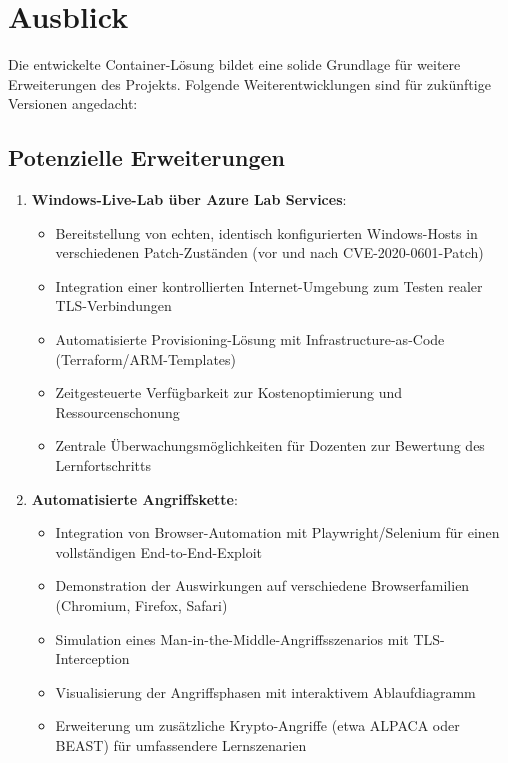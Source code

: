 \documentclass{article}
\begin{document}
\newpage

\section{Ausblick}
Die entwickelte Container-Lösung bildet eine solide Grundlage für weitere Erweiterungen des Projekts. Folgende Weiterentwicklungen sind für zukünftige Versionen angedacht:

\subsection{Potenzielle Erweiterungen}
\begin{enumerate}
  \item \textbf{Windows-Live-Lab über Azure Lab Services}: 
  \begin{itemize}
    \item Bereitstellung von echten, identisch konfigurierten Windows-Hosts in verschiedenen Patch-Zuständen (vor und nach CVE-2020-0601-Patch)
    \item Integration einer kontrollierten Internet-Umgebung zum Testen realer TLS-Verbindungen
    \item Automatisierte Provisioning-Lösung mit Infrastructure-as-Code (Terraform/ARM-Templates)
    \item Zeitgesteuerte Verfügbarkeit zur Kostenoptimierung und Ressourcenschonung
    \item Zentrale Überwachungsmöglichkeiten für Dozenten zur Bewertung des Lernfortschritts
  \end{itemize}
  
  \item \textbf{Automatisierte Angriffskette}: 
  \begin{itemize}
    \item Integration von Browser-Automation mit Playwright/Selenium für einen vollständigen End-to-End-Exploit
    \item Demonstration der Auswirkungen auf verschiedene Browserfamilien (Chromium, Firefox, Safari)
    \item Simulation eines Man-in-the-Middle-Angriffsszenarios mit TLS-Interception
    \item Visualisierung der Angriffsphasen mit interaktivem Ablaufdiagramm
    \item Erweiterung um zusätzliche Krypto-Angriffe (etwa ALPACA oder BEAST) für umfassendere Lernszenarien
  \end{itemize}

\end{enumerate}
\end{document}
